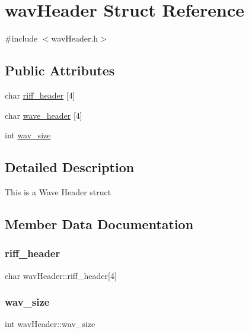 \hypertarget{structwavHeader}{}\section{wav\+Header Struct Reference}
\label{structwavHeader}


{\ttfamily \#include $<$wav\+Header.\+h$>$}

\subsection*{Public Attributes}
\begin{DoxyCompactItemize}
\item 
char \hyperlink{structwavHeader_aa001e48dfa6193b32562533ad119c60d}{riff\+\_\+header} \mbox{[}4\mbox{]}
\item 
char \hyperlink{structwavHeader_ae9a0bfdec6e8b7ba48dd27d7ac587f62}{wave\+\_\+header} \mbox{[}4\mbox{]}
\item 
int \hyperlink{structwavHeader_adf513d299b6989b3046347077e077c82}{wav\+\_\+size}
\end{DoxyCompactItemize}


\subsection{Detailed Description}
This is a Wave Header struct 

\subsection{Member Data Documentation}
\mbox{\label{structwavHeader_aa001e48dfa6193b32562533ad119c60d}} 
\subsubsection{\texorpdfstring{riff\+\_\+header}{riff\_header}}
{\footnotesize\ttfamily char wav\+Header\+::riff\+\_\+header\mbox{[}4\mbox{]}}

\mbox{\label{structwavHeader_adf513d299b6989b3046347077e077c82}} 
\subsubsection{\texorpdfstring{wav\+\_\+size}{wav\_size}}
{\footnotesize\ttfamily int wav\+Header\+::wav\+\_\+size}

